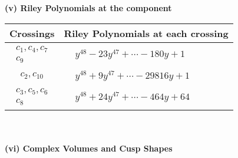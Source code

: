 \documentclass[1p]{elsarticle_modified}
\theoremstyle{definition}
\begin{document}
\newpage\renewcommand{\arraystretch}{1}
\flushleft \textbf{(v) Riley Polynomials at the component}\newline \\
\begin{tabular}{m{50pt}|m{274pt}}
Crossings & \hspace{64pt}Riley Polynomials at each crossing \\
\hline $$\begin{aligned}c_{1},c_{4},c_{7}\\c_{9}\end{aligned}$$&$\begin{aligned}
&y^{48}-23 y^{47}+\cdots-180 y+1
\end{aligned}$\\
\hline $$\begin{aligned}c_{2},c_{10}\end{aligned}$$&$\begin{aligned}
&y^{48}+9 y^{47}+\cdots-29816 y+1
\end{aligned}$\\
\hline $$\begin{aligned}c_{3},c_{5},c_{6}\\c_{8}\end{aligned}$$&$\begin{aligned}
&y^{48}+24 y^{47}+\cdots-464 y+64
\end{aligned}$\\
\hline
\end{tabular}\\~\\
\newpage\flushleft \textbf{(vi) Complex Volumes and Cusp Shapes}
\end{document}

